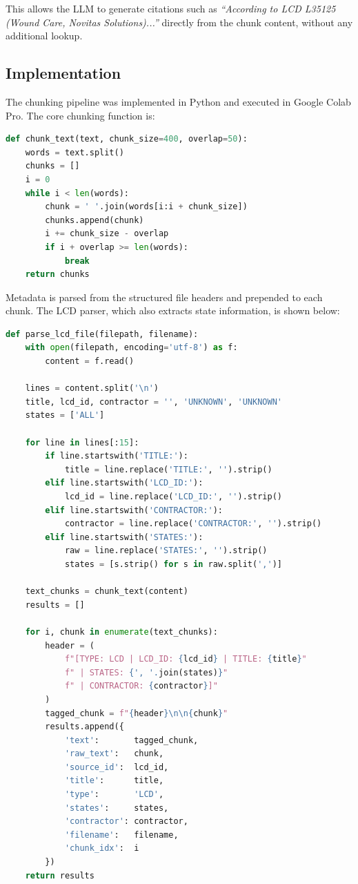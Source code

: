 \documentclass[12pt, letterpaper]{article}
\begin{document}
This allows the LLM to generate citations such as \textit{``According to LCD L35125
(Wound Care, Novitas Solutions)...''} directly from the chunk content, without any
additional lookup.

\subsection{Implementation}

The chunking pipeline was implemented in Python and executed in Google Colab Pro.
The core chunking function is:

\begin{lstlisting}[language=Python, caption=Core sliding-window chunking function]
def chunk_text(text, chunk_size=400, overlap=50):
    words = text.split()
    chunks = []
    i = 0
    while i < len(words):
        chunk = ' '.join(words[i:i + chunk_size])
        chunks.append(chunk)
        i += chunk_size - overlap
        if i + overlap >= len(words):
            break
    return chunks
\end{lstlisting}

Metadata is parsed from the structured file headers and prepended to each chunk.
The LCD parser, which also extracts state information, is shown below:

\begin{lstlisting}[language=Python, caption=LCD file parser with state metadata extraction]
def parse_lcd_file(filepath, filename):
    with open(filepath, encoding='utf-8') as f:
        content = f.read()

    lines = content.split('\n')
    title, lcd_id, contractor = '', 'UNKNOWN', 'UNKNOWN'
    states = ['ALL']

    for line in lines[:15]:
        if line.startswith('TITLE:'):
            title = line.replace('TITLE:', '').strip()
        elif line.startswith('LCD_ID:'):
            lcd_id = line.replace('LCD_ID:', '').strip()
        elif line.startswith('CONTRACTOR:'):
            contractor = line.replace('CONTRACTOR:', '').strip()
        elif line.startswith('STATES:'):
            raw = line.replace('STATES:', '').strip()
            states = [s.strip() for s in raw.split(',')]

    text_chunks = chunk_text(content)
    results = []

    for i, chunk in enumerate(text_chunks):
        header = (
            f"[TYPE: LCD | LCD_ID: {lcd_id} | TITLE: {title}"
            f" | STATES: {', '.join(states)}"
            f" | CONTRACTOR: {contractor}]"
        )
        tagged_chunk = f"{header}\n\n{chunk}"
        results.append({
            'text':       tagged_chunk,
            'raw_text':   chunk,
            'source_id':  lcd_id,
            'title':      title,
            'type':       'LCD',
            'states':     states,
            'contractor': contractor,
            'filename':   filename,
            'chunk_idx':  i
        })
    return results
\end{lstlisting}
\end{document}
